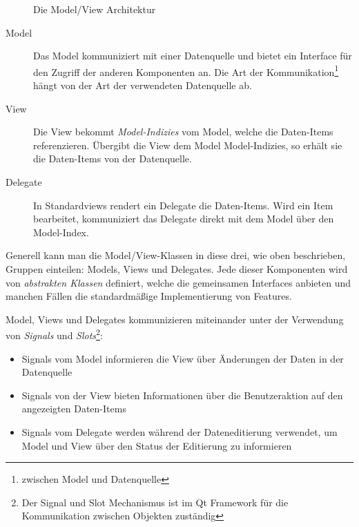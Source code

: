 \documentclass[11pt,a4paper,titlepage]{scrreprt}
\begin{document}
\begin{figure}[h]
\begin{center}
\caption{Die Model/View Architektur}
\end{center}
\end{figure}

\begin{description}
\item[Model]
Das Model kommuniziert mit einer Datenquelle und bietet ein Interface für den Zugriff
der anderen Komponenten an. Die Art der Kommunikation\footnote{zwischen Model und
Datenquelle} hängt von der Art der verwendeten Datenquelle ab.
\item[View]
Die View bekommt {\itshape Model-Indizies} vom Model, welche die Daten-Items referenzieren.
Übergibt die View dem Model Model-Indizies, so erhält sie die Daten-Items von der Datenquelle.
\item[Delegate]
In Standardviews rendert ein Delegate die Daten-Items. Wird ein Item bearbeitet,
kommuniziert das Delegate direkt mit dem Model über den Model-Index.
\end{description}

Generell kann man die Model/View-Klassen in diese drei, wie oben beschrieben, Gruppen
einteilen: Models, Views und Delegates. Jede dieser Komponenten wird von {\itshape abstrakten
Klassen} definiert, welche die gemeinsamen Interfaces anbieten und manchen Fällen die
standardmäßige Implementierung von Features.

Model, Views und Delegates kommunizieren miteinander unter der Verwendung von 
{\itshape Signals} und {\itshape Slots}\footnote{Der Signal und Slot Mechanismus 
ist im Qt Framework für die Kommunikation zwischen Objekten zuständig}:
\begin{itemize}
\item Signals vom Model informieren die View über Änderungen der Daten in der Datenquelle
\item Signals von der View bieten Informationen über die Benutzeraktion auf den angezeigten
Daten-Items
\item Signals vom Delegate werden während der Dateneditierung verwendet, um Model und
View über den Status der Editierung zu informieren
\end{itemize}
\end{document}
